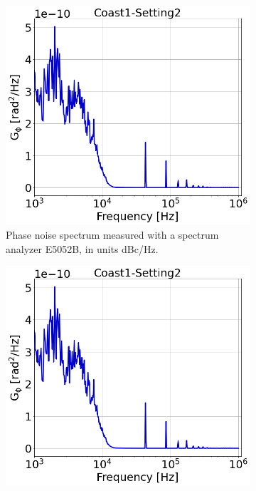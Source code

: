 \begin{figure}[!ht]
    \centering
    \begin{subfigure}[t]{0.42\textwidth}
        \centering
        \includegraphics[width=1\textwidth]{./images/app_B/coast1_setting2_Gyy.png}
        \caption{Phase noise spectrum measured with a spectrum analyzer E5052B, in units dBc/Hz.}
        \label{fig:coast1_setting2_a}
    \end{subfigure}
    \hfill
    \begin{subfigure}[t]{0.42\textwidth}
        \centering
        \includegraphics[width=1 \textwidth]{./images/app_B/coast1_setting2_Gyy.png}

\end{subfigure}
\end{figure}
